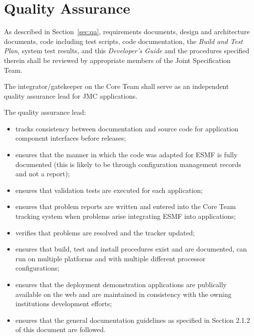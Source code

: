 
\section{Quality Assurance}
\label{sec:app_qa}

As described in Section~\ref{sec:qa}, requirements documents, design 
and architecture documents, code including
test scripts, code documentation, the {\it Build and Test Plan}, system test
results, and this {\it Developer's Guide} and the procedures specified
therein shall be reviewed by appropriate members of the Joint Specification 
Team.  

The integrator/gatekeeper on the Core Team shall serve as an independent
quality assurance lead for JMC applications.

The quality assurance lead:
\begin{itemize}
\item tracks consistency between documentation and source code for
      application component interfaces before releases;
\item ensures that the manner in which the code was adapted for ESMF 
      is fully documented (this is likely to be through configuration 
      management records and not a report);
\item ensures that validation tests are executed for each application; 
\item ensures that problem reports are written and entered into the 
      Core Team tracking system when problems arise integrating ESMF 
      into applications;
\item verifies that problems are resolved and the tracker updated;
\item ensures that build, test and install procedures exist and are documented, can run
   on multiple platforms and with multiple different processor configurations;
\item ensures that the deployment demonstration applications are publically available on the
   web and are maintained in consistency with the owning institutions
   development efforts;
\item ensures that the general documentation guidelines as specified in 
Section 2.1.2 of this document are followed.   
\end{itemize}






